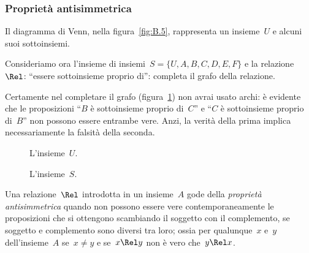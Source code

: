 
\subsubsection{Proprietà antisimmetrica}

\begin{exrig}
 \begin{esempio}

Il diagramma di Venn, nella figura~\ref{fig:B.5}, rappresenta un insieme~\(U\) e 
alcuni suoi sottoinsiemi.

Consideriamo ora l'insieme di insiemi~\(S = \lbrace U, A, B, C, D, E, F \rbrace\) 
e la relazione~\(\Rel\): ``essere sottoinsieme proprio di'':
completa il grafo della relazione.

Certamente nel completare il grafo (figura~\ref{fig:B.6}) non avrai usato archi: 
è evidente che le proposizioni ``\(B\) è sottoinsieme proprio di~\(C\)'' e ``\(C\)
è sottoinsieme proprio di~\(B\)'' non possono essere entrambe vere. Anzi, la 
verità della prima implica necessariamente la falsità della seconda.
 \end{esempio}
\end{exrig}

\begin{inaccessibleblock}
 \begin{figure}[b]
\begin{minipage}[b]{.45\textwidth}
 \centering
 
 \caption{L'insieme~\(U\).}\label{fig:B.5}
\end{minipage}\hfil
\begin{minipage}[b]{.45\textwidth}
 \centering
 
 \caption{L'insieme~\(S\).}\label{fig:B.6}
\end{minipage}
\end{figure}
\end{inaccessibleblock}

\begin{definizione}
Una relazione~\(\Rel\) introdotta in un insieme~\(A\) gode della \emph{proprietà 
antisimmetrica} quando non possono essere vere
contemporaneamente le proposizioni che si ottengono scambiando il soggetto con 
il complemento, se soggetto e complemento sono diversi
tra loro; ossia per qualunque~\(x\) e~\(y\) dell'insieme~\(A\) se~\(x \neq y\) e se~\(x 
\Rel y\) non è vero che~\(y \Rel x\).
\end{definizione}

